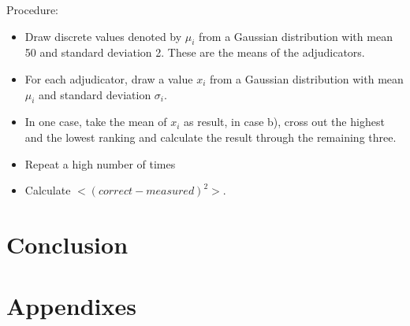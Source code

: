 \documentclass[%
 reprint,
 amsmath,amssymb,
 aps,
]{revtex4-1}
\begin{document}
Procedure:
\begin{itemize}
	\item Draw discrete values denoted by $\mu_i$ from a Gaussian distribution with mean 50 and standard deviation 2. These are the means of the adjudicators.
	\item For each adjudicator, draw a value $x_i$ from a Gaussian distribution with mean $\mu_i$ and standard deviation $\sigma_i$. 
	\item In one case, take the mean of $x_i$ as result, in case b), cross out the highest and the lowest ranking and calculate the result through the remaining three.
	\item Repeat a high number of times
	\item Calculate $<(correct - measured)^2>$. 
\end{itemize}


\section{Conclusion}

\begin{acknowledgments}
\end{acknowledgments}

\appendix

\section{Appendixes}



\end{document}
